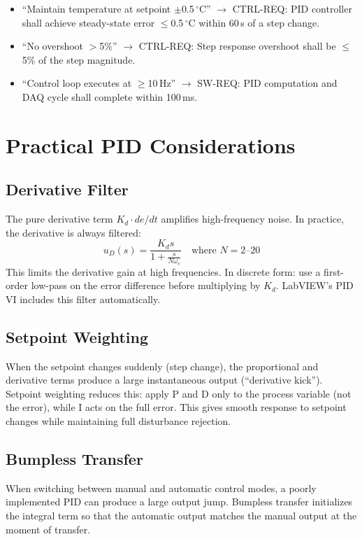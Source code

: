\documentclass[11pt,letterpaper,twoside,openany]{book}
\newcommand{\degC}{\ensuremath{{}^{\circ}\text{C}}}
\begin{document}
\begin{keyconceptbox}
\begin{itemize}[nosep,leftmargin=1.5em]
\item ``Maintain temperature at setpoint $\pm$0.5\,\degC{}'' $\to$ CTRL-REQ: PID controller shall achieve steady-state error $\leq$0.5\,\degC{} within 60\,s of a step change.
\item ``No overshoot $>$5\%'' $\to$ CTRL-REQ: Step response overshoot shall be $\leq$5\% of the step magnitude.
\item ``Control loop executes at $\geq$10\,Hz'' $\to$ SW-REQ: PID computation and DAQ cycle shall complete within 100\,ms.
\end{itemize}
\end{keyconceptbox}


\section{Practical PID Considerations}

\subsection{Derivative Filter}
The pure derivative term $K_d \cdot de/dt$ amplifies high-frequency noise. In practice, the derivative is always filtered:
\begin{equation}
u_D(s) = \frac{K_d s}{1 + \frac{s}{N \omega_c}} \quad \text{where } N = 2\text{--}20
\end{equation}
This limits the derivative gain at high frequencies. In discrete form: use a first-order low-pass on the error difference before multiplying by $K_d$. LabVIEW's PID VI includes this filter automatically.

\subsection{Setpoint Weighting}
When the setpoint changes suddenly (step change), the proportional and derivative terms produce a large instantaneous output (``derivative kick''). Setpoint weighting reduces this: apply P and D only to the process variable (not the error), while I acts on the full error. This gives smooth response to setpoint changes while maintaining full disturbance rejection.

\subsection{Bumpless Transfer}
When switching between manual and automatic control modes, a poorly implemented PID can produce a large output jump. Bumpless transfer initializes the integral term so that the automatic output matches the manual output at the moment of transfer.
\end{document}
